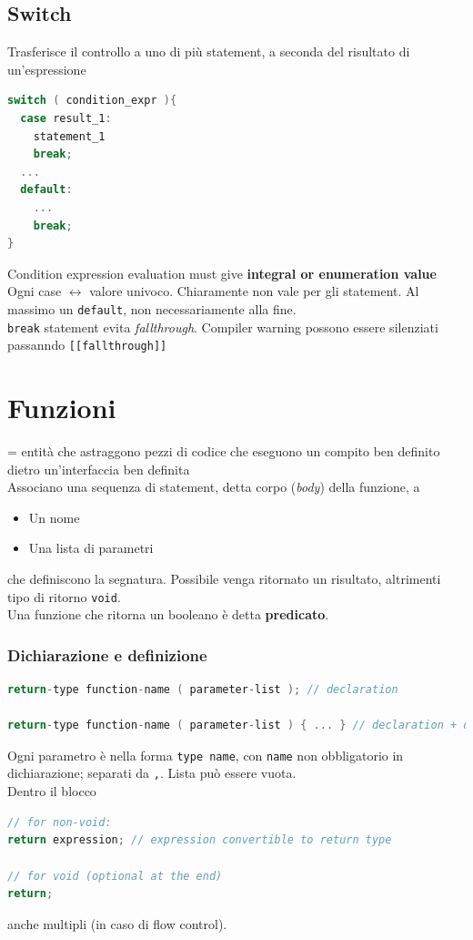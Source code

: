 \documentclass[10pt, oneside]{book}
\begin{document}
\section{Switch}
Trasferisce il controllo a uno di più statement, a seconda del risultato di un'espressione
\begin{lstlisting}[language=C++]
switch ( condition_expr ){
  case result_1:
    statement_1
    break;
  ...
  default:
    ...
    break;
}
\end{lstlisting}
Condition expression evaluation must give \textbf{integral or enumeration value}\\
Ogni case $\longleftrightarrow$ valore univoco. Chiaramente non vale per gli statement. Al massimo un \texttt{default}, non necessariamente alla fine.\\
\texttt{break} statement evita \textit{fallthrough}. Compiler warning possono essere silenziati passanndo \texttt{[[fallthrough]]}

\chapter{Funzioni}
= entità che astraggono pezzi di codice che eseguono un compito ben definito dietro un'interfaccia ben definita\\
Associano una sequenza di statement, detta corpo (\textit{body}) della funzione, a
\begin{itemize}
\item Un nome
\item Una lista di parametri
\end{itemize}
che definiscono la segnatura. Possibile venga ritornato un risultato, altrimenti tipo di ritorno \texttt{void}.\\
Una funzione che ritorna un booleano è detta \textbf{predicato}.

\subsection{Dichiarazione e definizione}
\begin{lstlisting}[language=C++]
return-type function-name ( parameter-list ); // declaration

return-type function-name ( parameter-list ) { ... } // declaration + definition
\end{lstlisting}
Ogni parametro è nella forma \texttt{type name}, con \texttt{name} non obbligatorio in dichiarazione; separati da \texttt{,}. Lista può essere vuota.\\
Dentro il blocco
\begin{lstlisting}[language=C++]
// for non-void:
return expression; // expression convertible to return type

// for void (optional at the end)
return; 
\end{lstlisting}
anche multipli (in caso di flow control).
\end{document}
